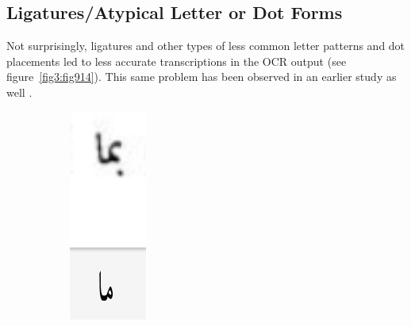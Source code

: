 \subsection{Ligatures/Atypical Letter or Dot Forms}

Not surprisingly, ligatures and other types of less common letter patterns and
dot placements led to less accurate transcriptions in the OCR output (see
figure~\ref{fig3:fig914}). This same problem has been observed in an earlier study as well \cite{kiessling2017important}.

\begin{figure}[!ht]
	\centering
	\begin{subfigure}[b]{0.3\linewidth}
	\centering
	\includegraphics[width=\linewidth]{images/image21.png}

\end{subfigure}
\end{figure}

